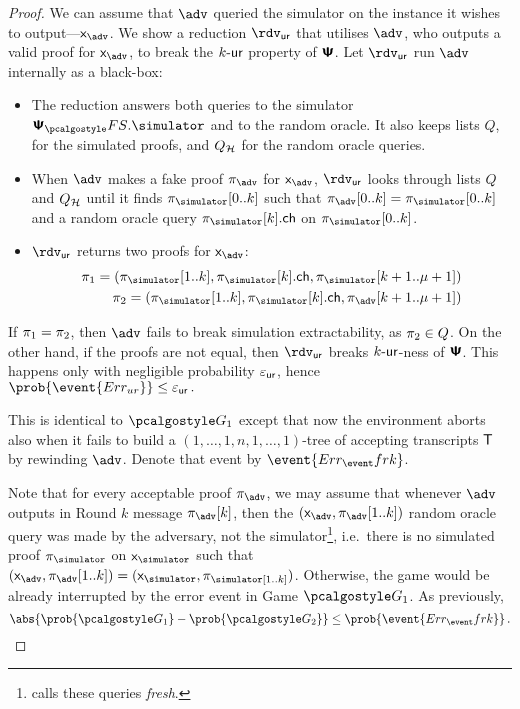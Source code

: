 \documentclass[runningheads,10pt]{llncs}
\begin{document}
\begin{proof}
  We can assume that $\advse$ queried the simulator on the instance it wishes to
  output---$\inp_{\advse}$. We show a reduction $\rdvur$ that utilises $\advse$,
  who outputs a valid proof for $\inp_{\advse}$, to break the ${k\text{-}\mathsf{ur}}$ property of
  $\bm{\mathsf{\Psi}}$. Let $\rdvur$ run $\advse$ internally as a black-box:
\begin{itemize}
	\item The reduction answers both queries to the simulator $\psfs.\simulator$ and to the random oracle. 
	It also keeps lists $Q$, for the simulated proofs, and $Q_{\mathcal{H}}$ for the random oracle queries. 
\item When $\advse$ makes a fake proof $\zkproof_{\advse}$ for $\inp_{\advse}$,
  $\rdvur$ looks through lists $Q$ and $Q_{\mathcal{H}}$ until it finds
  $\zkproof_{\simulator}[0..k]$ such that
  $\zkproof_{\advse}[0..k] = \zkproof_{\simulator}[0..k]$
  and a random oracle query $\zkproof_{\simulator}[k].\ch$ on
  $\zkproof_{\simulator}[0..k]$.
	\item $\rdvur$ returns two proofs for $\inp_{\advse}$:
	\begin{align*}
		\zkproof_1 = (\zkproof_{\simulator}[1..k],
		\zkproof_{\simulator}[k].\ch, \zkproof_{\simulator}[k + 1..\mu + 1])\\
		\zkproof_2 = (\zkproof_{\simulator}[1..k],
		\zkproof_{\simulator}[k].\ch, \zkproof_{\advse}[k + 1..\mu + 1])
	\end{align*}
	\end{itemize}  
	If $\pi_1 = \pi_2$, then $\advse$ fails to break simulation
  extractability, as $\pi_2 \in Q$. On the other hand, if the proofs are
  not equal, then $\rdvur$ breaks ${k\text{-}\mathsf{ur}}$-ness of $\bm{\mathsf{\Psi}}$. This happens only with
  negligible probability $\varepsilon_{\mathsf{ur}}$, hence \( \prob{\event{\errur}} \leq
  \epsur\,. \)
	
   This is identical to $\game{1}$ except that now the environment
  aborts also when it fails to build a $(1, \ldots, 1, n, 1, \ldots, 1)$-tree
  of accepting transcripts $\mathsf{T}$ by rewinding $\advse$. Denote that event by
  $\event{\errfrk}$. 

   Note that for every acceptable proof
  $\zkproof_{\advse}$, we may assume that whenever $\advse$ outputs in Round $k$
  message $\zkproof_{\advse}[k]$, then the
  $(\inp_{\advse}, \zkproof_{\advse}[1..k])$ random oracle query was made
  by the adversary, not the simulator\footnote{\cite{INDOCRYPT:FKMV12} calls
    these queries \emph{fresh}.}, i.e.~there is no simulated proof
  $\zkproof_\simulator$ on $\inp_\simulator$ such that
  $(\inp_{\advse}, \zkproof_{\advse} [1..k]) = (\inp_\simulator,
  \zkproof_\simulator[1..k])$. Otherwise, the game would be already interrupted
  by the error event in Game $\game{1}$.  As previously,
\[
  \abs{\prob{\game{1}} - \prob{\game{2}}} \leq \prob{\event{\errfrk}}\,.
\]


\end{proof}
\end{document}
